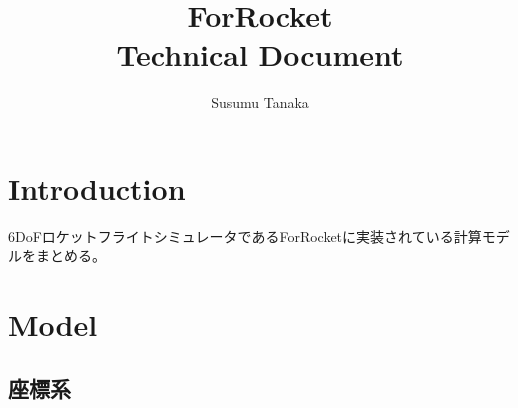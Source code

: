 ﻿\documentclass[a4paper]{jsarticle}
\begin{document}
\title{ForRocket \\ Technical Document}
\author{Susumu Tanaka}
\maketitle

\section{Introduction}
6DoFロケットフライトシミュレータであるForRocketに実装されている計算モデルをまとめる。



\section{Model}
\subsection{座標系}
\end{document}
